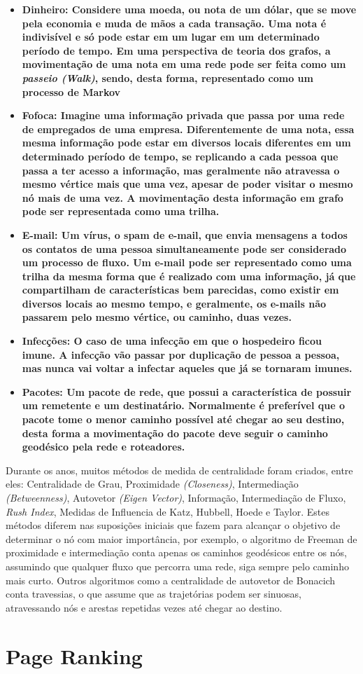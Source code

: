 \begin{itemize}
\item \textbf{Dinheiro: Considere uma moeda, ou nota de um dólar, que se move pela
economia e muda de mãos a cada transação. Uma nota é indivisível e só pode estar
em um lugar em um determinado período de tempo. Em uma perspectiva de teoria dos
grafos, a movimentação de uma nota em uma rede pode ser feita como um \textit{passeio (Walk)},
sendo, desta forma, representado como um processo de Markov}
\item \textbf{Fofoca: Imagine uma informação privada que passa por uma rede
de empregados de uma empresa. Diferentemente de uma nota, essa mesma informação
pode estar em diversos locais diferentes em um determinado período de tempo, se
replicando a cada pessoa que passa a ter acesso a informação, mas geralmente
não atravessa o mesmo vértice mais que uma vez, apesar de poder visitar o mesmo nó
mais de uma vez. A movimentação desta informação em grafo pode ser representada como
uma trilha.}
\item \textbf{E-mail: Um vírus, o spam de e-mail, que envia mensagens a todos os
contatos de uma pessoa simultaneamente pode ser considerado um processo de fluxo.
Um e-mail pode ser representado como uma trilha da mesma forma que é realizado 
com uma informação, já que compartilham de características bem parecidas, como 
existir em diversos locais ao mesmo tempo, e geralmente, os e-mails não passarem
pelo mesmo vértice, ou caminho, duas vezes.} 
\item \textbf{Infecções: O caso de uma infecção em que o hospedeiro ficou imune.
A infecção vão passar por duplicação de pessoa a pessoa, mas nunca vai voltar a infectar
aqueles que já se tornaram imunes.} 
\item \textbf{Pacotes: Um pacote de rede, que possui a característica de possuir
um remetente e um destinatário. Normalmente é preferível que o pacote tome o menor
caminho possível até chegar ao seu destino, desta forma a movimentação do pacote
deve seguir o caminho geodésico pela rede e roteadores.} 
\end{itemize}

Durante os anos, muitos métodos de medida de centralidade foram criados, entre eles:
Centralidade de Grau, Proximidade \textit{(Closeness)}, Intermediação \textit{(Betweenness)}, 
Autovetor \textit{(Eigen Vector)}, Informação, Intermediação de Fluxo, \textit{Rush Index},
Medidas de Influencia de Katz, Hubbell, Hoede e Taylor. Estes métodos diferem nas suposições
iniciais que fazem para alcançar o objetivo de determinar o nó com maior importância, por exemplo,
o algoritmo de Freeman de proximidade e intermediação conta apenas os caminhos geodésicos entre 
os nós, assumindo que qualquer fluxo que percorra uma rede, siga sempre pelo caminho mais curto.
Outros algoritmos como a centralidade de autovetor de Bonacich conta travessias, o que assume
que as trajetórias podem ser sinuosas, atravessando nós e arestas repetidas vezes até chegar ao
destino\cite{centrality}.

\section{Page Ranking}
